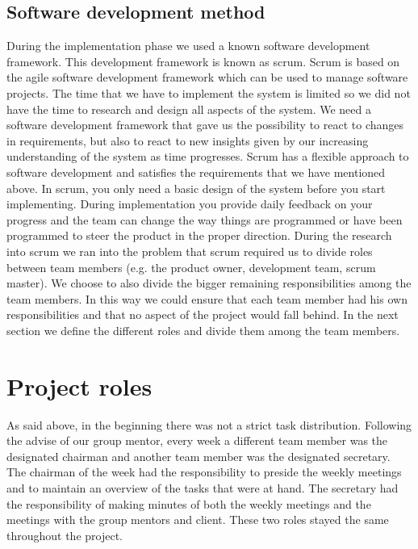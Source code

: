 \subsection{Software development method}
During the implementation phase we used a known software development framework.
This development framework is known as scrum.
Scrum is based on the agile software development framework which can be used to 
manage software projects.
The time that we have to implement the system is limited so we did not have the time to research and design all aspects of the system. We need a software development framework that gave us the possibility to react to changes in requirements, but also to react to new insights given by our increasing understanding of the system as time progresses.
Scrum has a flexible approach to software development and satisfies the requirements that we have mentioned above.
In scrum, you only need a basic design of the system before you start implementing.
During implementation you provide daily feedback on your progress and the team can change the way things are programmed or have been programmed to steer the product in the proper direction.
During the research into scrum we ran into the problem that scrum required us to divide roles between team members (e.g. the product owner, development team, scrum master).
We choose to also divide the bigger remaining responsibilities among the team members.
In this way we could ensure that each team member had his own responsibilities and that no aspect of the project would fall behind.
In the next section we define the different roles and divide them among the team members.

\section{Project roles}
As said above, in the beginning there was not a strict task distribution.
Following the advise of our group mentor, every week a different team member was the designated chairman and another team member was the designated secretary.
The chairman of the week had the responsibility to preside the weekly meetings and to maintain an overview of the tasks that were at hand.
The secretary had the responsibility of making minutes of both the weekly meetings and the meetings with the group mentors and client.
These two roles stayed the same throughout the project.\\

